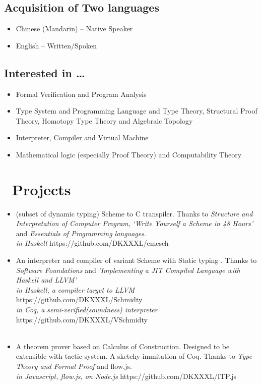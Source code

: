 \documentclass{resume}
\begin{document}
\subsection{\textbf{Acquisition of Two languages}}
\begin{itemize}
\item Chinese (Mandarin) – Native Speaker
\item English – Written/Spoken
\end{itemize}

\subsection{\textbf{Interested in …}}
\begin{itemize}
\item Formal Verification and Program Analysis
\item Type System and Programming Language and Type Theory, Structural Proof Theory, Homotopy Type Theory and Algebraic Topology
\item Interpreter, Compiler and Virtual Machine
\item Mathematical logic (especially Proof Theory) and Computability Theory
\end{itemize}
\section{\faCogs\ Projects}
\begin{itemize}
\item (subset of dynamic typing) Scheme to C transpiler. Thanks to \textit{Structure and Interpretation of Computer Program}, \textit{‘Write Yourself a Scheme in 48 Hours’} and \textit{Essentials of Programming languages}. \\
\textit{in Haskell} \hfill https://github.com/DKXXXL/emesch
\\
\item An interpreter and compiler of variant Scheme with Static typing . Thanks to \textit{Software Foundations} and \textit{'Implementing a JIT Compiled Language with Haskell and LLVM'} \\
\textit{in Haskell, a compiler target to LLVM} \hfill https://github.com/DKXXXL/Schmidty \\
\textit{in Coq, a semi-verified(soundness) interpreter} \hfill https://github.com/DKXXXL/VSchmidty \\
\\
\item A theorem prover based on Calculus of Construction. Designed to be extensible with tactic system. A sketchy immitation of Coq. Thanks to \textit{Type Theory and Formal Proof} and flow.js.\\
\textit{in Javascript, flow.js, on Node.js} \hfill https://github.com/DKXXXL/ITP.js
\end{itemize}
\end{document}
